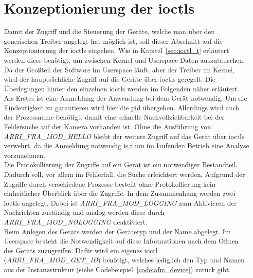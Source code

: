
\section{Konzeptionierung der \acl{ioctl}s}\label{sec:ioctl}
Damit der Zugriff und die Steuerung der Geräte, welche man über den generischen Treiber angelegt hat möglich ist, soll dieser Abschnitt auf die Konzeptionierung der \ac{ioctl}s eingehen.
Wie in Kapitel~\ref{sec:ioctl_t} erläutert werden diese benötigt, um zwischen Kernel und Userspace Daten auszutauschen. Da der Großteil der Software im Userspace läuft, aber der Treiber im Kernel, wird der hauptsächliche Zugriff auf die Geräte über \ac{ioctl}s geregelt. Die Überlegungen hinter den einzelnen \ac{ioctl}s werden im Folgenden näher erläutert.\\


Als Erstes ist eine Anmeldung der Anwendung bei dem Gerät notwendig. Um die Eindeutigkeit zu garantieren wird hier die \ac{pid} übergeben. Allerdings wird auch der Prozessname benötigt, damit eine schnelle Nachvollziehbarkeit bei der Fehlersuche auf der Kamera vorhanden ist.
Ohne die Ausführung von \textit{ARRI\_FRA\_MOD\_HELLO} bleibt der weitere Zugriff auf das Gerät über \ac{ioctl}s verwehrt, da die Anmeldung notwendig is,t um im laufenden Betrieb eine Analyse vorzunehmen.\\

Die Protokollierung der Zugriffe auf ein Gerät ist ein notwendiger Bestandteil. Dadurch soll, vor allem im Fehlerfall, die Suche erleichtert werden. Aufgrund der Zugriffe durch verschiedene Prozesse besteht ohne Protokollierung kein einheitlicher Überblick über die Zugriffe.
In dem Zusammenhang werden zwei \ac{ioctl}s angelegt. Dabei ist \textit{ARRI\_FRA\_MOD\_LOGGING} zum Aktivieren der Nachrichten zuständig und analog werden diese durch \textit{ARRI\_FRA\_MOD\_NOLOGGING} deaktiviert. \\

Beim Anlegen des Geräts werden der Gerätetyp und der Name abgelegt. Im Userspace besteht die Notwendigkeit auf diese Informationen nach dem Öffnen des Geräts zuzugreifen. Dafür wird ein eigenes \ac{ioctl} (\textit{ARRI\_FRA\_MOD\_GET\_ID}) benötigt, welches lediglich den Typ und Namen aus der Instanzstruktur (siehe Codebeispiel~\ref{code:afm_device}) zurück gibt.\\

